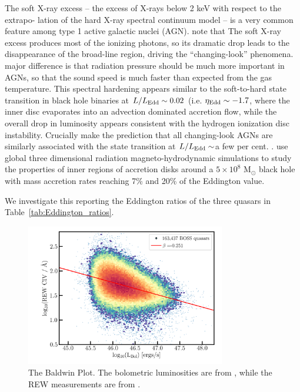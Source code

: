 \documentclass[a4paper,fleqn,usenatbib]{mnras}
\begin{document}
The soft X-ray excess – the excess of X-rays below 2 keV with respect
to the extrapo- lation of the hard X-ray spectral continuum model – is
a very common feature among type 1 active galactic nuclei (AGN). 
\citet{NodaDone2018} note that
The soft X-ray excess produces most of the ionizing photons, so its
dramatic drop leads to the disappearance of the broad-line region,
driving the ``changing-look'' phenomena.  major difference is that
radiation pressure should be much more important in AGNs, so that the
sound speed is much faster than expected from the gas temperature.
This spectral hardening appears similar to the soft-to-hard state
transition in black hole binaries at $L / L_{\rm Edd} \sim 0.02$
(i.e. $\eta_{\rm Edd} \sim -1.7$, where the inner disc evaporates into
an advection dominated accretion flow, while the overall drop in
luminosity appears consistent with the hydrogen ionization disc
instability.  Crucially \citet{NodaDone2018} make the prediction that
all changing-look AGNs are similarly associated with the state
transition at $L / L_{\rm Edd} \sim$a few per cent.
\citet{JiangYF2014, JiangYF2016, JiangYF2019}.
\citet{JiangYF2019arXiv} use global three dimensional radiation
magneto-hydrodynamic simulations to study the properties of inner
regions of accretion disks around a $5 \times 10^{8}$ M$_{\odot}$
black hole with mass accretion rates reaching 7\% and 20\% of the
Eddington value.

We investigate this reporting the Eddington ratios of the three
quasars in Table~\ref{tab:Eddington_ratios}.

\begin{figure}
  \centering
  \includegraphics[width=8.7cm, trim=0.2cm 0.2cm 0.2cm 0.2cm, clip]
  {figures/CIV_CLQs_Baldwin_LBol_20191015.png}
   \vspace{-12pt}
   \caption[]{The Baldwin Plot. The bolometric luminosities are from \citet{Kozlowski2017},
     while the REW measurements are from \citet{Hamann2017}.}
  \label{fig:CIV_Baldwin}
\end{figure}
\end{document}
